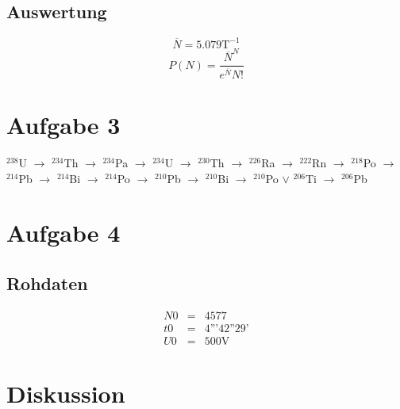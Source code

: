 \documentclass[12pt,a4paper]{article}
\begin{document}
\subsection*{Auswertung}
\[ \overline{N} = 5.079 \mbox{T}^{-1} \]
\[ P(N) = \frac{\overline{N}^N}{e^{\overline{N}}N!} \]

\section*{Aufgabe 3}
$^{238}$U $\rightarrow$  $^{234}$Th $\rightarrow$  $^{234}$Pa $\rightarrow$  $^{234}$U $\rightarrow$  $^{230}$Th $\rightarrow$  $^{226}$Ra $\rightarrow$  $^{222}$Rn $\rightarrow$  $^{218}$Po $\rightarrow$  $^{214}$Pb $\rightarrow$  $^{214}$Bi $\rightarrow$  $^{214}$Po $\rightarrow$  $^{210}$Pb $\rightarrow$  $^{210}$Bi $\rightarrow$  $^{210}$Po $\lor$  $^{206}$Ti $\rightarrow$  $^{206}$Pb  


\section*{Aufgabe 4}
\subsection*{Rohdaten}
\begin{eqnarray*}
N0 & = & 4577 \\
t0 & = & 4\mbox{'''}42\mbox{''}29\mbox{'} \\
U0 & = & 500\mbox{V}
\end{eqnarray*}


\section*{Diskussion}
\end{document}
